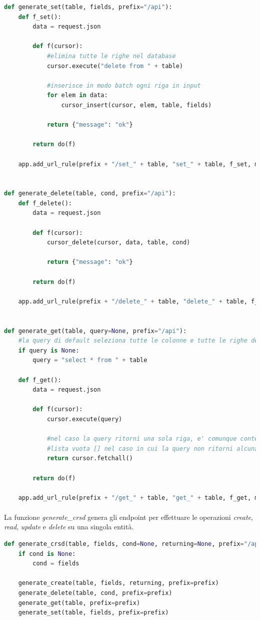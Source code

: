 \documentclass[11pt,a4paper,english]{article}
\begin{document}
\begin{lstlisting}[language=python, caption=Funzioni \emph{generate\_*}]
def generate_set(table, fields, prefix="/api"):
    def f_set():
        data = request.json

        def f(cursor):
            #elimina tutte le righe nel database
            cursor.execute("delete from " + table)

            #inserisce in modo batch ogni riga in input
            for elem in data:
                cursor_insert(cursor, elem, table, fields)

            return {"message": "ok"}

        return do(f)

    app.add_url_rule(prefix + "/set_" + table, "set_" + table, f_set, methods=["POST"])


def generate_delete(table, cond, prefix="/api"):
    def f_delete():
        data = request.json

        def f(cursor):
            cursor_delete(cursor, data, table, cond)

            return {"message": "ok"}

        return do(f)

    app.add_url_rule(prefix + "/delete_" + table, "delete_" + table, f_delete, methods=["DELETE"])


def generate_get(table, query=None, prefix="/api"):
    #la query di default seleziona tutte le colonne e tutte le righe della tabella
    if query is None:
        query = "select * from " + table

    def f_get():
        data = request.json

        def f(cursor):
            cursor.execute(query)

            #nel caso la query ritorni una sola riga, e' comunque contenuta in una lista unitaria [row1]
            #lista vuota [] nel caso in cui la query non ritorni alcuna riga
            return cursor.fetchall()

        return do(f)

    app.add_url_rule(prefix + "/get_" + table, "get_" + table, f_get, methods=["GET"])
\end{lstlisting}

\paragraph{} La funzione \emph{generate\_crsd} genera gli endpoint per effettuare le operazioni \emph{create}, \emph{read}, \emph{update} e \emph{delete} su una singola entità.

\begin{lstlisting}[language=python, caption=generate\_crsd]
def generate_crsd(table, fields, cond=None, returning=None, prefix="/api"):
    if cond is None:
        cond = fields

    generate_create(table, fields, returning, prefix=prefix)
    generate_delete(table, cond, prefix=prefix)
    generate_get(table, prefix=prefix)
    generate_set(table, fields, prefix=prefix)
\end{lstlisting}
\end{document}
